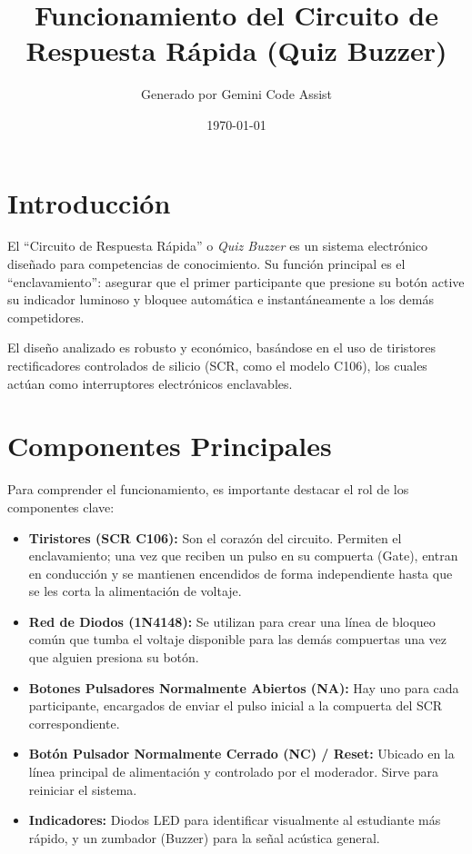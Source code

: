 \documentclass[12pt,a4paper]{article}
\title{Funcionamiento del Circuito de Respuesta Rápida (Quiz Buzzer)}
\author{Generado por Gemini Code Assist}
\date{\today}
\begin{document}
\maketitle

\section{Introducción}
El ``Circuito de Respuesta Rápida'' o \textit{Quiz Buzzer} es un sistema electrónico diseñado para competencias de conocimiento. Su función principal es el ``enclavamiento'': asegurar que el primer participante que presione su botón active su indicador luminoso y bloquee automática e instantáneamente a los demás competidores. 

El diseño analizado es robusto y económico, basándose en el uso de tiristores rectificadores controlados de silicio (SCR, como el modelo C106), los cuales actúan como interruptores electrónicos enclavables.

\section{Componentes Principales}
Para comprender el funcionamiento, es importante destacar el rol de los componentes clave:
\begin{itemize}
    \item \textbf{Tiristores (SCR C106):} Son el corazón del circuito. Permiten el enclavamiento; una vez que reciben un pulso en su compuerta (Gate), entran en conducción y se mantienen encendidos de forma independiente hasta que se les corta la alimentación de voltaje.
    \item \textbf{Red de Diodos (1N4148):} Se utilizan para crear una línea de bloqueo común que tumba el voltaje disponible para las demás compuertas una vez que alguien presiona su botón.
    \item \textbf{Botones Pulsadores Normalmente Abiertos (NA):} Hay uno para cada participante, encargados de enviar el pulso inicial a la compuerta del SCR correspondiente.
    \item \textbf{Botón Pulsador Normalmente Cerrado (NC) / Reset:} Ubicado en la línea principal de alimentación y controlado por el moderador. Sirve para reiniciar el sistema.
    \item \textbf{Indicadores:} Diodos LED para identificar visualmente al estudiante más rápido, y un zumbador (Buzzer) para la señal acústica general.
\end{itemize}
\end{document}

